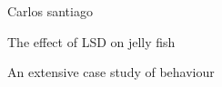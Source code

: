 \documentclass{book}
\begin{document}
\begin{titlepage}
	\setlength{\parindent}{0pt}
	\vspace*{.15\textheight}
	{\LARGE Carlos santiago\par}
	\medbreak
	{\Huge The effect of LSD on jelly fish\par}
	\smallbreak
	{\Large An extensive case study of behaviour\par}
\end{titlepage}
\end{document}
